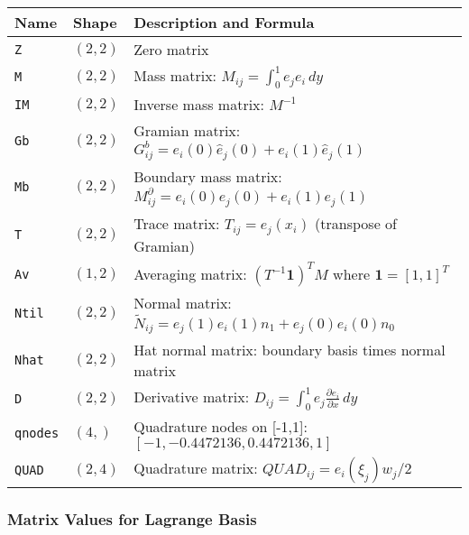 \begin{longtable}{|p{2cm}|p{2.5cm}|p{8.5cm}|}
\hline
\textbf{Name} & \textbf{Shape} & \textbf{Description and Formula} \\
\hline
\endhead

\texttt{Z} & $(2, 2)$ & Zero matrix \\
\hline

\texttt{M} & $(2, 2)$ & Mass matrix: $M_{ij} = \int_0^1 e_j e_i \, dy$ \\
\hline

\texttt{IM} & $(2, 2)$ & Inverse mass matrix: $M^{-1}$ \\
\hline

\texttt{Gb} & $(2, 2)$ & Gramian matrix: $G^b_{ij} = e_i(0)\hat{e}_j(0) + e_i(1)\hat{e}_j(1)$ \\
\hline

\texttt{Mb} & $(2, 2)$ & Boundary mass matrix: $M^{\partial}_{ij} = e_i(0)e_j(0) + e_i(1)e_j(1)$ \\
\hline

\texttt{T} & $(2, 2)$ & Trace matrix: $T_{ij} = e_j(x_i)$ (transpose of Gramian) \\
\hline

\texttt{Av} & $(1, 2)$ & Averaging matrix: $(T^{-1} \mathbf{1})^T M$ where $\mathbf{1} = [1, 1]^T$ \\
\hline

\texttt{Ntil} & $(2, 2)$ & Normal matrix: $\tilde{N}_{ij} = e_j(1)e_i(1)n_1 + e_j(0)e_i(0)n_0$ \\
\hline

\texttt{Nhat} & $(2, 2)$ & Hat normal matrix: boundary basis times normal matrix \\
\hline

\texttt{D} & $(2, 2)$ & Derivative matrix: $D_{ij} = \int_0^1 e_j \frac{\partial e_i}{\partial x} \, dy$ \\
\hline

\texttt{qnodes} & $(4,)$ & Quadrature nodes on [-1,1]: $[-1, -0.4472136, 0.4472136, 1]$ \\
\hline

\texttt{QUAD} & $(2, 4)$ & Quadrature matrix: $QUAD_{ij} = e_i(\xi_j) w_j / 2$ \\
\hline

\end{longtable}

\subsubsection{Matrix Values for Lagrange Basis}

